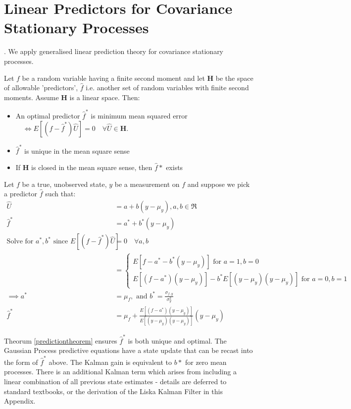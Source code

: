 \section{Linear Predictors for Covariance Stationary Processes} \label{sec:ap_prediction}.
We apply generalised linear prediction theory for covariance stationary processes. 
\begin{thm} \label{thm:prediction} Let $f$ be a random variable having a finite second moment and let \textbf{H} be the space of allowable 'predictors', $\hat{f}$ i.e. another set of random variables with finite second moments.  Assume \textbf{H} is a linear space. Then:
\begin{itemize}
\item[] An optimal predictor $\hat{f}^*$ is minimum mean squared error$ \quad \Leftrightarrow E[(f - \hat{f}^*)\hat{U}] = 0 \quad \forall \hat{U} \in \textbf{H} $.
\item[] $\hat{f}^*$ is unique in the mean square sense
\item[] If \textbf{H} is closed in the mean square sense, then $\hat{f}*$ exists
\end{itemize} \label{predictiontheorem}
\end{thm}

Let $f$ be a true, unobserved state, $y$ be a measurement on $f$ and suppose we pick a predictor $\hat{f}$ such that:
\begin{align}
\hat{U} &= a + b(y - \mu_y), a,b \in \Re \\
\hat{f}^* &= a^* + b^*(y - \mu_y) \\
\text{Solve for $a^*, b^*$ since } E[(f - \hat{f}^*)\hat{U}] &= 0 \quad \forall a,b\\
&= \begin{cases} E[f - a^* - b^*(y - \mu_y)]   \text{ for $a=1,b=0$} \\
E[(f - a^*)(y - \mu_y)] - b^*E[(y - \mu_y)(y - \mu_y)] \text{ for $a=0,b=1$} \end{cases}\\
\implies a^* &= \mu_f, \text{ and } b^* = \frac{\sigma_{f,y}}{\sigma^2_y} \\
\hat{f}^* &= \mu_f + \frac{E[(f - a^*)(y - \mu_y)]}{E[(y - \mu_y)(y - \mu_y)]} (y-\mu_y)
\end{align}

Theorum \ref{predictiontheorem} ensures $\hat{f}^*$ is both unique and optimal. The Gaussian Process predictive equations have a state update that can be recast into the form of $\hat{f}^*$ above. The Kalman gain is equivalent to $b*$ for zero mean processes. There is an additional Kalman term which arises from including a linear combination of all previous state estimates - details are deferred to standard textbooks, or the derivation of the Liska Kalman Filter in this Appendix.

